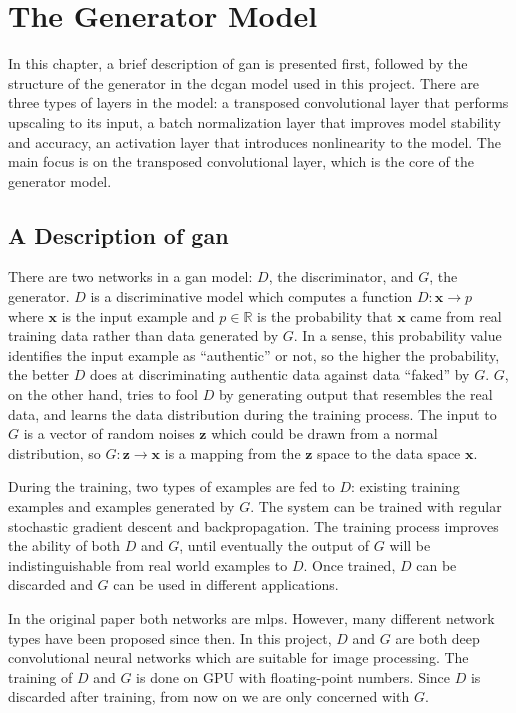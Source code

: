 
\chapter{The Generator Model}

In this chapter, a brief description of \gls{gan} is presented first, followed by the structure of the
generator in the \gls{dcgan} model used in this project. There are three types of layers in the model:
a transposed convolutional layer that performs upscaling to its input, a batch normalization layer that
improves model stability and accuracy, an activation layer that introduces nonlinearity to the model.
The main focus is on the transposed convolutional layer, which is the core of the generator model.

\section{A Description of \gls{gan}}

There are two networks in a \gls{gan} model: $D$, the discriminator, and $G$, the generator. $D$ is a
discriminative model which computes a function $D: \boldsymbol{x} \rightarrow p$ where $\mathbf{x}$ is the
input example and $p \in \mathbb{R}$ is the probability that $\mathbf{x}$ came from real training data
rather than data generated by $G$. In a sense, this probability value identifies the input example as
"`authentic"' or not, so the higher the probability, the better $D$ does at discriminating authentic data
against data "`faked"' by $G$. $G$, on the other hand, tries to fool $D$ by generating output that resembles
the real data, and learns the data distribution during the training process. The input to $G$ is a vector
of random noises $\mathbf{z}$ which could be drawn from a normal distribution, so $G: \mathbf{z} \rightarrow
\mathbf{x}$ is a mapping from the $\mathbf{z}$ space to the data space $\mathbf{x}$.

During the training, two types of examples are fed to $D$: existing training examples and examples generated
by $G$. The system can be trained with regular stochastic gradient descent and backpropagation. The training
process improves the ability of both $D$ and $G$, until eventually the output of $G$ will be
indistinguishable from real world examples to $D$. Once trained, $D$ can be discarded and $G$ can be used
in different applications.

In the original paper both networks are \glspl{mlp}. However, many different network types have been
proposed since then. In this project, $D$ and $G$ are both deep convolutional neural networks which are
suitable for image processing. The training of $D$ and $G$ is done on GPU with floating-point numbers. Since
$D$ is discarded after training, from now on we are only concerned with $G$.

